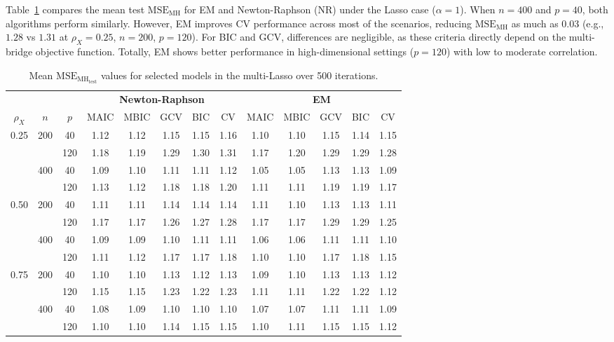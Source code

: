 \documentclass[twoside]{article}
\begin{document}
Table~\ref{tab:lasso_comparison} compares the mean test $\mathrm{MSE_{MH}}$ for EM and Newton-Raphson (NR) under the Lasso case ($\alpha=1$). When $n=400$ and $p=40$, both algorithms perform similarly. However, EM improves CV performance across most of the scenarios, reducing $\mathrm{MSE_{MH}}$ as much as $0.03$ (e.g., $1.28$ vs $1.31$ at $\rho_X=0.25$, $n=200$, $p=120$). For BIC and GCV, differences are negligible, as these criteria directly depend on the multi-bridge objective function. Totally, EM shows better performance in high-dimensional settings ($p=120$) with low to moderate correlation.
\begin{table}[h!]
	\centering
	\small
\caption{Mean $\mathrm{MSE_{MH_{test}}}$ values for selected models in the multi-Lasso over 500 iterations.}
	\label{tab:lasso_comparison}
	\begin{tabular}{ccc|ccccc|ccccc}
		\multicolumn{3}{c}{} & \multicolumn{5}{c}{\textbf{Newton-Raphson}} & \multicolumn{5}{c}{\textbf{EM}} \\
		\cline{1-13}
		\multicolumn{1}{c}{$\rho_X$} & \multicolumn{1}{c}{$n$} & \multicolumn{1}{c|}{$p$} & MAIC & MBIC & GCV & BIC & CV & MAIC & MBIC & GCV & BIC & CV \\
		\hline %
0.25 & 200 & 40  & 1.12 & 1.12 & 1.15 & 1.15 & 1.16 & 1.10  & 1.10  & 1.15  & 1.14  &  1.15 \\
	 &  & 120 & 1.18 & 1.19 & 1.29 & 1.30 & 1.31 &  1.17 & 1.20  & 1.29  &  1.29 & 1.28  \\ \cline{2-13}
	 & 400 & 40  & 1.09 & 1.10 & 1.11 & 1.11 & 1.12 &  1.05 & 1.05  &  1.13 &1.13   &  1.09 \\ 	
	 &  & 120 & 1.13 & 1.12 & 1.18 & 1.18 & 1.20 & 1.11  &  1.11 & 1.19  &  1.19 & 1.17  \\
		\hline
		0.50 & 200 & 40  & 1.11 & 1.11 & 1.14 & 1.14 & 1.14 & 1.11  & 1.10  & 1.13  &  1.13 & 1.11  \\
 &  & 120 & 1.17 & 1.17 & 1.26 & 1.27 & 1.28 & 1.17  & 1.17  &  1.29 & 1.29  & 1.25  \\ \cline{2-13}
 & 400 & 40  & 1.09 & 1.09 & 1.10 & 1.11 & 1.11 & 1.06  & 1.06  & 1.11  &  1.11 &  1.10 \\
 &  & 120 & 1.11 & 1.12 & 1.17 & 1.17 & 1.18 & 1.10  & 1.10  &  1.17 &1.18 & 1.15  \\
		\hline
		0.75 & 200 & 40  & 1.10 & 1.10 & 1.13 & 1.12 & 1.13 & 1.09  & 1.10  &  1.13 & 1.13  & 1.12  \\
 &  & 120 & 1.15 & 1.15 & 1.23 & 1.22 & 1.23 &  1.11 & 1.11  &  1.22 & 1.22  & 1.12  \\\cline{2-13}
 & 400 & 40  & 1.08 & 1.09 & 1.10 & 1.10 & 1.10 & 1.07  & 1.07  &  1.11 & 1.11  &  1.09 \\
 & & 120 & 1.10 & 1.10 & 1.14 & 1.15 & 1.15 & 1.10  &  1.11 &  1.15 &   1.15& 1.12  \\
		\hline
	\end{tabular}
\end{table}
\end{document}
